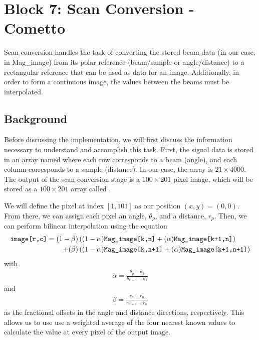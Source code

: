 
\section{Block 7: Scan Conversion - Cometto}

Scan conversion handles the task of converting the stored beam data (in our case, in Mag\_image) from its polar reference (beam/sample or angle/distance) to a rectangular reference that can be used as data for an image.  Additionally, in order to form a continuous image, the values between the beams must be interpolated.

\subsection{Background}

Before discussing the implementation, we will first discuss the information necessary to understand and accomplish this task.  First, the signal data is stored in an array named  where each row corresponds to a beam (angle), and each column corresponds to a sample (distance).  In our case, the array is $21 \times 4000$.  The output of the scan conversion stage is a $100 \times 201$ pixel image, which will be stored as a $100 \times 201$ array called .

We will define the pixel at index $[1,101]$ as our position $(x,y) = (0,0)$.  From there, we can assign each pixel an angle, $\theta_p$, and a distance, $r_p$.  Then, we can perform bilinear interpolation using the equation
\begin{align*}
    \texttt{image[r,c]} = (1-\beta) &\left( (1 - \alpha) \texttt{Mag\_image[k,n]} + (\alpha) \texttt{Mag\_image[k+1,n]}  \right) \\ 
    + (\beta) &\left( (1-\alpha) \texttt{Mag\_image[k,n+1]} + (\alpha) \texttt{Mag\_image[k+1,n+1]} \right)
\end{align*}
with
\begin{align*}
    \alpha = \frac{\theta_p - \theta_k}{\theta_{k+1} - \theta_k}
\end{align*}
and
\begin{align*}
    \beta = \frac{r_p - r_n}{r_{n+1} - r_n}
\end{align*}
as the fractional offsets in the angle and distance directions, respectively.  This allows us to use use a weighted average of the four nearest known values to calculate the value at every pixel of the output image.


